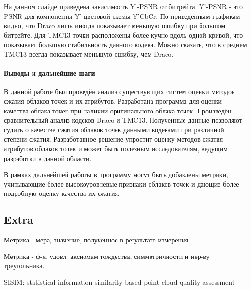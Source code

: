 \documentclass[a4paper,12pt]{extreport}
\begin{document}
На данном слайде приведена зависимость Y'-PSNR от битрейта. Y'-PSNR - это PSNR
для компоненты Y' цветовой схемы Y'CbCr. По приведенным графикам видно, что
Draco лишь иногда показывает меньшую ошибку при большом битрейте. Для TMC13
точки расположены более кучно вдоль одной кривой, что показывает большую
стабильность данного кодека. Можно сказать, что в среднем TMC13 всегда
показывает меньшую ошибку, чем Draco.

\paragraph{Выводы и дальнейшие шаги}

В данной работе был проведён анализ существующих систем оценки методов сжатия
облаков точек и их атрибутов. Разработана программа для оценки качества облака
точек при наличии оригинального облака точек. Произведён сравнительный анализ
кодеков Draco и TMC13. Полученные данные позволяют судить о качестве сжатия
облаков точек данными кодеками при различной степени сжатия. Разработанное
решение упростит оценку методов сжатия атрибутов облаков точек и может быть
полезным исследователям, ведущим разработки в данной области.

В рамках дальнейшей работы в программу могут быть добавлены метрики, учитывающие
более высокоуровневые признаки облаков точек и дающие более подробную оценку
качества их сжатия.

\subsection*{Extra}

\noindent Метрика - мера, значение, полученное в результате измерения.

\noindent Метрика - ф-я, удовл. аксиомам тождества, симметричности и нер-ву
треугольника.

\noindent SISIM: statistical information similarity-based point cloud quality
assessment
\end{document}
